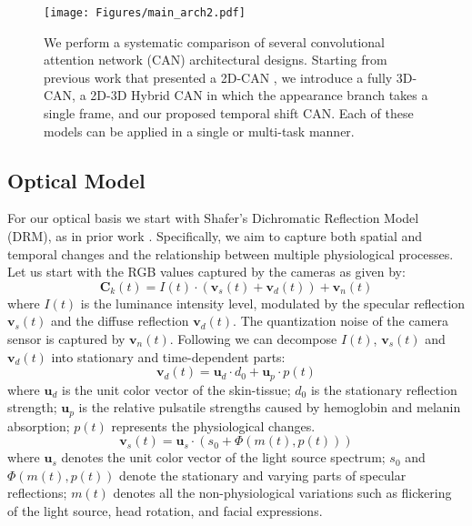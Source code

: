 \documentclass{article}
\begin{document}
\begin{figure*}[t!]
  \texttt{[image: Figures/main\_arch2.pdf]}
  \caption{We perform a systematic comparison of several convolutional attention network (CAN) architectural designs. Starting from previous work that presented a 2D-CAN \citep{chen2018deepmag}, we introduce a fully 3D-CAN, a 2D-3D Hybrid CAN in which the appearance branch takes a single frame, and our proposed temporal shift CAN. Each of these models can be applied in a single or multi-task manner.}
  \label{fig:architecture}
  \vspace{-0.3cm}
\end{figure*}

\subsection{Optical Model}
For our optical basis we start with Shafer's Dichromatic Reflection Model (DRM), as in prior work \citep{wang2016algorithmic,chen2018deepphys}. Specifically, we aim to capture both spatial and temporal changes and the relationship between multiple physiological processes. Let us start with the RGB values captured by the cameras as given by:
\begin{equation} \label{eq:1}
	\pmb{C}_k(t)=I(t) \cdot (\pmb{v}_s(t)+\pmb{v}_d(t))+\pmb{v}_n(t)
\end{equation}
where $I(t)$ is the luminance intensity level, modulated by the specular reflection $\pmb{v}_s(t)$ and the diffuse reflection $\pmb{v}_d(t)$. The quantization noise of the camera sensor is captured by $\pmb{v}_n(t)$. Following \cite{wang2016algorithmic} we can decompose $I(t)$, $\pmb{v}_s(t)$ and $\pmb{v}_d(t)$ into stationary and time-dependent parts:
\begin{equation} \label{eq:2}
	\pmb{v}_d(t) = \pmb{u}_d \cdot d_0 + \pmb{u}_p \cdot p(t)  
\end{equation}
where $\pmb{u}_d$ is the unit color vector of the skin-tissue; $d_0$ is the stationary reflection strength; $\pmb{u}_p$ is the relative pulsatile strengths caused by hemoglobin and melanin absorption; $p(t)$ represents the physiological changes.
\begin{equation} \label{eq:3}
	\pmb{v}_s(t) = \pmb{u}_s \cdot (s_0+\Phi(m(t),p(t))) 
\end{equation}
where $\pmb{u}_s$ denotes the unit color vector of the light source spectrum; $s_0$ and $\Phi(m(t),p(t))$ denote the stationary and varying parts of specular reflections; $m(t)$ denotes all the non-physiological variations such as flickering of the light source, head rotation, and facial expressions.  
\end{document}
